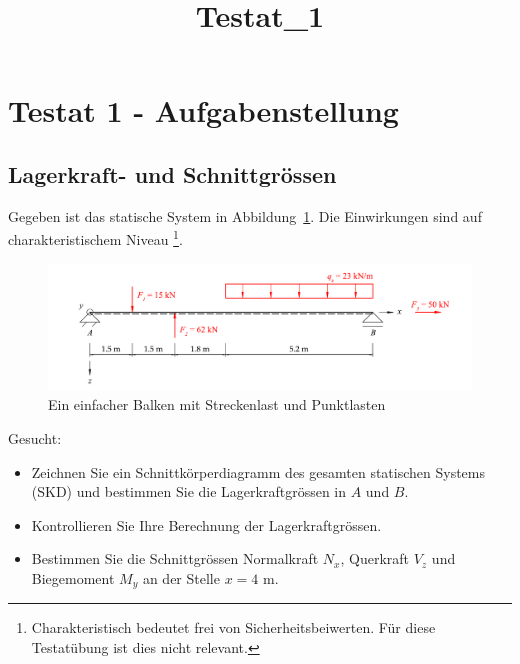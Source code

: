 \documentclass[
  12pt,
  letterpaper,
  DIV=11,
  egregdoesnotlikesansseriftitles]{scrartcl}
\title{Testat\_1}
\author{}
\date{}
\providecommand{\tightlist}{%
  \setlength{\itemsep}{0pt}\setlength{\parskip}{0pt}}\usepackage{longtable,booktabs,array}
\renewcommand{\maketitle}{}
\begin{document}
\maketitle
\ifdefined\Shaded\renewenvironment{Shaded}{\begin{tcolorbox}[breakable, boxrule=0pt, interior hidden, sharp corners, borderline west={3pt}{0pt}{shadecolor}, enhanced, frame hidden]}{\end{tcolorbox}}\fi

\hypertarget{testat-1---aufgabenstellung}{%
\section{Testat 1 -
Aufgabenstellung}\label{testat-1---aufgabenstellung}}

\hypertarget{lagerkraft--und-schnittgruxf6ssen}{%
\subsection{Lagerkraft- und
Schnittgrössen}\label{lagerkraft--und-schnittgruxf6ssen}}

Gegeben ist das statische System in Abbildung~\ref{fig-system}. Die
Einwirkungen sind auf charakteristischem Niveau \footnote{Charakteristisch
  bedeutet frei von Sicherheitsbeiwerten. Für diese Testatübung ist dies
  nicht relevant.}.

\begin{figure}[H]

{\centering \includegraphics{BSI_HS23_Testat_01_files/mediabag/../images/Testat_01_HS23.pdf}

}

\caption{\label{fig-system}Ein einfacher Balken mit Streckenlast und
Punktlasten}

\end{figure}

Gesucht:

\begin{itemize}
\tightlist
\item
  Zeichnen Sie ein Schnittkörperdiagramm des gesamten statischen Systems
  (SKD) und bestimmen Sie die Lagerkraftgrössen in \(A\) und \(B\).
\item
  Kontrollieren Sie Ihre Berechnung der Lagerkraftgrössen.
\item
  Bestimmen Sie die Schnittgrössen Normalkraft \(N_x\), Querkraft
  \(V_z\) und Biegemoment \(M_y\) an der Stelle \(x=4\) m.
\end{itemize}
\end{document}
